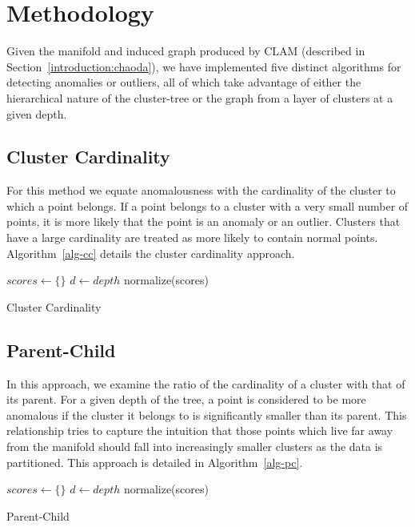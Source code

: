 \section{Methodology}
\label{sec:methodology}

Given the manifold and induced graph produced by CLAM (described in Section~\ref{introduction:chaoda}), we have implemented five distinct algorithms for detecting anomalies or outliers, all of which take advantage of either the hierarchical nature of the cluster-tree or the graph from a layer of clusters at a given depth.


\subsection{Cluster Cardinality}

For this method we equate anomalousness with the cardinality of the cluster to which a point belongs.
If a point belongs to a cluster with a very small number of points, it is more likely that the point is an anomaly or an outlier.
Clusters that have a large cardinality are treated as more likely to contain normal points.
Algorithm~\ref{alg-cc} details the cluster cardinality approach.

\begin{algorithm}
\DontPrintSemicolon
\SetAlgoLined
{}
 $scores \leftarrow \{\}$\;
 $d \leftarrow depth$\;
 normalize(scores)\;
 \caption{Cluster Cardinality}
 \label{alg-cc}
\end{algorithm}

\subsection{Parent-Child}

In this approach, we examine the ratio of the cardinality of a cluster with that of its parent.
For a given depth of the tree, a point is considered to be more anomalous if the cluster it belongs to is significantly smaller than its parent.
This relationship tries to capture the intuition that those points which live far away from the manifold should fall into increasingly smaller clusters as the data is partitioned.
This approach is detailed in Algorithm~\ref{alg-pc}.

\begin{algorithm}
\DontPrintSemicolon
\SetAlgoLined
{}
 $scores \leftarrow \{\}$\;
 $d \leftarrow depth$\;
 normalize(scores)\;
 \caption{Parent-Child}
 \label{alg-pc}
\end{algorithm}

